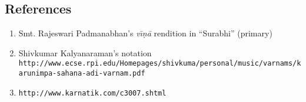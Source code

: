 \documentclass[12pt]{article}
\begin{document}
\subsection*{References}
\begin{enumerate}
\item Smt. Rajeswari Padmanabhan's \emph{v\=\i\d{n}\=a} rendition in ``Surabhi'' (primary)
\item Shivkumar Kalyanaraman's notation \\{\small\verb|http://www.ecse.rpi.edu/Homepages/shivkuma/personal/music/varnams/karunimpa-sahana-adi-varnam.pdf|}
\item {\small\verb|http://www.karnatik.com/c3007.shtml|}
\end{enumerate}
\end{document}

